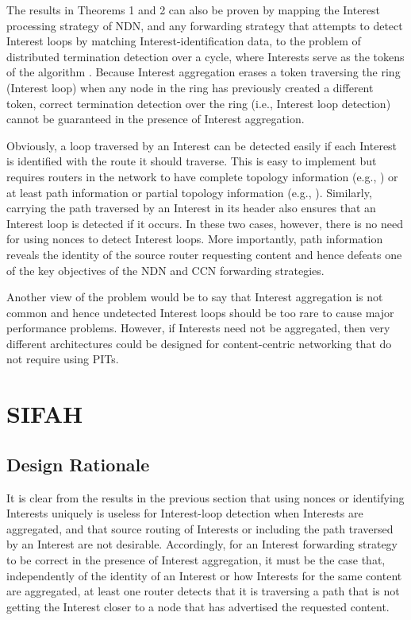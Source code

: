 \documentclass{ancs15-alternate}
\begin{document}
The results in Theorems 1 and 2
can also be proven by mapping the Interest processing strategy of NDN, and any forwarding strategy that attempts to detect Interest loops 
by matching Interest-identification data,  to the problem of distributed termination detection over a cycle, where Interests serve as the tokens of the algorithm \cite{dijkstra, dtd}.
Because Interest aggregation erases a token traversing the ring (Interest loop) when any node in the ring has previously created a different token,  correct termination detection over the ring (i.e., Interest loop detection) cannot be guaranteed in the presence of Interest aggregation.

Obviously,  a loop  traversed by an Interest can be detected easily if each Interest is identified with the route it should traverse.  
This is easy to implement but  requires routers in the network to have  complete topology information
(e.g., \cite{nlsr, icnp98, vutukury}) or at least path information or partial topology information (e.g., \cite{alva, icnp98}).
Similarly, carrying the path traversed by an Interest in its header also ensures that an Interest loop is detected if it occurs.
In these two cases, however, there is no need for using nonces to detect Interest  loops. More importantly, path information reveals the identity of the source router requesting content and hence defeats one of the key objectives of the NDN and CCN forwarding strategies.

Another view of the problem would be to say that Interest aggregation is not common and hence undetected Interest loops should be too rare to cause major performance problems. However, if Interests need not be aggregated, then very different architectures could be designed for content-centric networking that do not require using PITs.


\section{SIFAH
}
\label{sec-design}

\subsection{Design Rationale}

It is clear from the results in the previous section that using nonces or identifying Interests uniquely is useless for Interest-loop detection when Interests are aggregated, and that source routing of Interests  or including the path traversed by an Interest are not desirable. Accordingly, for an Interest  forwarding strategy to be correct in the presence of Interest aggregation, it must be the case that, independently of the identity of an Interest or how Interests for the same content are  aggregated, at least one router detects that it is  traversing a path that  is not  getting the Interest closer to a node that has advertised the requested content. 
\end{document}

